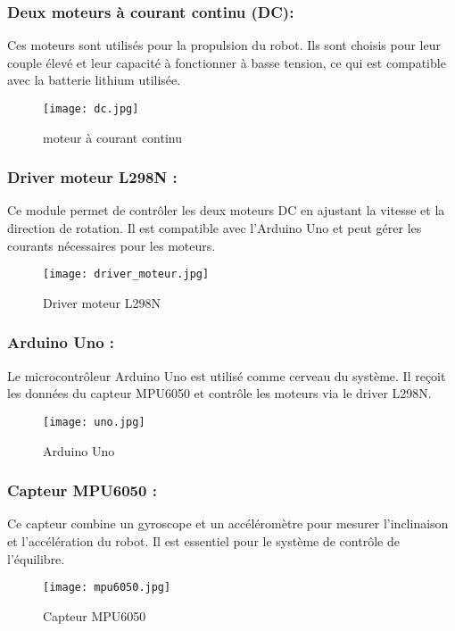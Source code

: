 \documentclass{report}
\begin{document}
\subsubsection{Deux moteurs à courant continu (DC):} 
Ces moteurs sont utilisés pour la propulsion du robot. Ils sont choisis pour leur couple élevé et leur capacité à fonctionner à basse tension, ce qui est compatible avec la batterie lithium utilisée.
\begin{figure}[h]
    \centering
    \texttt{[image: dc.jpg]} %
    \caption{moteur à courant continu}
    \label{fig:moteur à courant continu}
\end{figure}
\subsubsection{Driver moteur L298N :}  Ce module permet de contrôler les deux moteurs DC en ajustant la vitesse et la direction de rotation. Il est compatible avec l'Arduino Uno et peut gérer les courants nécessaires pour les moteurs.
\begin{figure}[h]
    \centering
    \texttt{[image: driver\_moteur.jpg]} %
    \caption{Driver moteur L298N}
    \label{fig:Driver moteur L298N}
\end{figure}
\subsubsection{Arduino Uno :}  Le microcontrôleur Arduino Uno est utilisé comme cerveau du système. Il reçoit les données du capteur MPU6050 et contrôle les moteurs via le driver L298N.
\begin{figure}[h]
    \centering
    \texttt{[image: uno.jpg]} %
    \caption{Arduino Uno}
    \label{fig:Arduino Uno}
\end{figure}
\subsubsection{Capteur MPU6050 :}  Ce capteur combine un gyroscope et un accéléromètre pour mesurer l'inclinaison et l'accélération du robot. Il est essentiel pour le système de contrôle de l'équilibre.
\begin{figure}[h]
    \centering
    \texttt{[image: mpu6050.jpg]} %
    \caption{Capteur MPU6050}
    \label{fig:Capteur MPU6050}
\end{figure}
\end{document}
